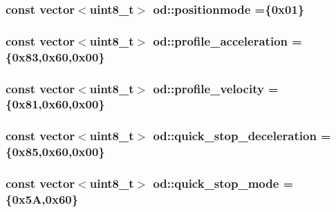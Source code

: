 \subsubsection[{\texorpdfstring{positionmode}{positionmode}}]{\setlength{\rightskip}{0pt plus 5cm}const vector$<$uint8\+\_\+t$>$ od\+::positionmode =\{0x01\}}\hypertarget{namespaceod_a85efca0656a6714d7227858e112c4a73}{}\label{namespaceod_a85efca0656a6714d7227858e112c4a73}
\subsubsection[{\texorpdfstring{profile\+\_\+acceleration}{profile_acceleration}}]{\setlength{\rightskip}{0pt plus 5cm}const vector$<$uint8\+\_\+t$>$ od\+::profile\+\_\+acceleration =\{0x83,0x60,0x00\}}\hypertarget{namespaceod_aced8c17d62c0e774949057de0a99f402}{}\label{namespaceod_aced8c17d62c0e774949057de0a99f402}
\subsubsection[{\texorpdfstring{profile\+\_\+velocity}{profile_velocity}}]{\setlength{\rightskip}{0pt plus 5cm}const vector$<$uint8\+\_\+t$>$ od\+::profile\+\_\+velocity =\{0x81,0x60,0x00\}}\hypertarget{namespaceod_a47b7c8f6797cc134be5ee1d78d83ee50}{}\label{namespaceod_a47b7c8f6797cc134be5ee1d78d83ee50}
\subsubsection[{\texorpdfstring{quick\+\_\+stop\+\_\+deceleration}{quick_stop_deceleration}}]{\setlength{\rightskip}{0pt plus 5cm}const vector$<$uint8\+\_\+t$>$ od\+::quick\+\_\+stop\+\_\+deceleration =\{0x85,0x60,0x00\}}\hypertarget{namespaceod_a57361a1a6b60fd8b93c2828fd7f5429f}{}\label{namespaceod_a57361a1a6b60fd8b93c2828fd7f5429f}
\subsubsection[{\texorpdfstring{quick\+\_\+stop\+\_\+mode}{quick_stop_mode}}]{\setlength{\rightskip}{0pt plus 5cm}const vector$<$uint8\+\_\+t$>$ od\+::quick\+\_\+stop\+\_\+mode =\{0x5\+A,0x60\}}\hypertarget{namespaceod_ab5b4d34058d08a758277bf52cd31d8c9}{}\label{namespaceod_ab5b4d34058d08a758277bf52cd31d8c9}
